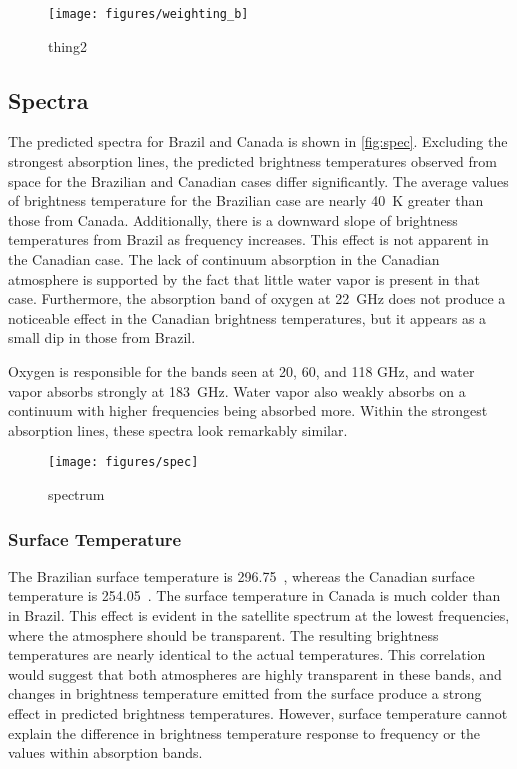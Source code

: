 \documentclass[twocol]{ametsoc}
\begin{document}
\begin{figure}
	\centering
	\texttt{[image: figures/weighting\_b]}
	\caption{thing2}
	\label{fig:weighting_b}
\end{figure}

\subsection{Spectra}

The predicted spectra for Brazil and Canada is shown in \autoref{fig:spec}.
Excluding the strongest absorption lines, the predicted brightness temperatures observed from space for the Brazilian and Canadian cases differ significantly.
The average values of brightness temperature for the Brazilian case are nearly 40~K greater than those from Canada.
Additionally, there is a downward slope of brightness temperatures from Brazil as frequency increases.
This effect is not apparent in the Canadian case.
The lack of continuum absorption in the Canadian atmosphere is supported by the fact that little water vapor is present in that case.
Furthermore, the absorption band of oxygen at 22~GHz does not produce a noticeable effect in the Canadian brightness temperatures, but it appears as a small dip in those from Brazil.

Oxygen is responsible for the bands seen at 20, 60, and 118 GHz, and water vapor absorbs strongly at 183~GHz. Water vapor also weakly absorbs on a continuum with higher frequencies being absorbed more.
Within the strongest absorption lines, these spectra look remarkably similar.

\begin{figure}
	\centering
	\texttt{[image: figures/spec]}
	\caption{spectrum}
	\label{fig:spec}
\end{figure}

\subsubsection{Surface Temperature}

The Brazilian surface temperature is 296.75~, whereas the Canadian surface temperature is 254.05~.
The surface temperature in Canada is much colder than in Brazil.
This effect is evident in the satellite spectrum at the lowest frequencies, where the atmosphere should be transparent.
The resulting brightness temperatures are nearly identical to the actual temperatures.
This correlation would suggest that both atmospheres are highly transparent in these bands, and changes in brightness temperature emitted from the surface produce a strong effect in predicted brightness temperatures.
However, surface temperature cannot explain the difference in brightness temperature response to frequency or the values within absorption bands.
\end{document}

